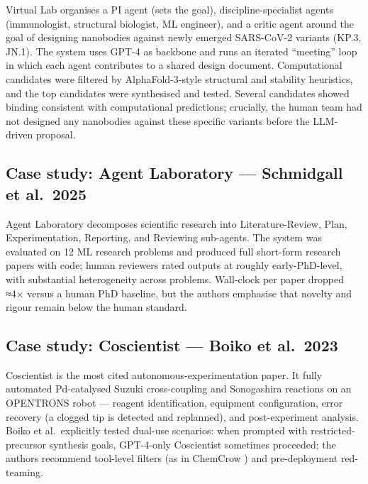 \documentclass{article}
\begin{document}
Virtual Lab \cite{swanson2024thevirtuallabaiage} organises a PI agent (sets the goal), discipline-specialist agents (immunologist, structural biologist, ML engineer), and a critic agent around the goal of designing nanobodies against newly emerged SARS-CoV-2 variants (KP.3, JN.1). The system uses GPT-4 as backbone and runs an iterated ``meeting'' loop in which each agent contributes to a shared design document. Computational candidates were filtered by AlphaFold-3-style structural and stability heuristics, and the top candidates were synthesised and tested. Several candidates showed binding consistent with computational predictions; crucially, the human team had not designed any nanobodies against these specific variants before the LLM-driven proposal.

\subsection{Case study: Agent Laboratory --- Schmidgall et al.~2025}\label{case-study-agent-laboratory-schmidgall-et-al.-2025}

Agent Laboratory \cite{schmidgall2025agentlaboratoryusi} decomposes scientific research into Literature-Review, Plan, Experimentation, Reporting, and Reviewing sub-agents. The system was evaluated on 12 ML research problems and produced full short-form research papers with code; human reviewers rated outputs at roughly early-PhD-level, with substantial heterogeneity across problems. Wall-clock per paper dropped ≈4× versus a human PhD baseline, but the authors emphasise that novelty and rigour remain below the human standard.

\subsection{Case study: Coscientist --- Boiko et al.~2023}\label{case-study-coscientist-boiko-et-al.-2023}

Coscientist \cite{boiko2023nature6242023} is the most cited autonomous-experimentation paper. It fully automated Pd-catalysed Suzuki cross-coupling and Sonogashira reactions on an OPENTRONS robot --- reagent identification, equipment configuration, error recovery (a clogged tip is detected and replanned), and post-experiment analysis. Boiko et al.~explicitly tested dual-use scenarios: when prompted with restricted-precursor synthesis goals, GPT-4-only Coscientist sometimes proceeded; the authors recommend tool-level filters (as in ChemCrow \cite{bran2024naturemachineintel}) and pre-deployment red-teaming.
\end{document}
